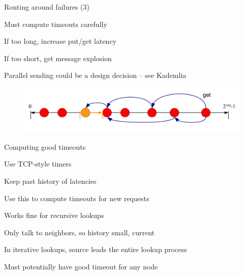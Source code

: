 \begin{frame}{Routing around failures (3)}

\BIL
\item Must compute timeouts carefully
\BI
\item If too long, increase put/get latency
\item If too short, get message explosion
\EI
\item Parallel sending could be a design decision -- see Kademlia
\EIL

\begin{figure}
	\includegraphics[width=\textwidth]{figs/10/dht-route-failure3}
\end{figure}

\end{frame}

\begin{frame}{Computing good timeouts}
	
\BIL
\item Use TCP-style timers
	\BI
	\item Keep past history of latencies
	\item Use this to compute timeouts for new requests
	\EI
\item Works fine for recursive lookups
	\BI
	\item Only talk to neighbors, so history small, current
	\EI
\item In iterative lookups, source leads the  entire lookup process
	\BI
	\item Must potentially have good timeout for any node
	\EI
\EIL

\end{frame}

